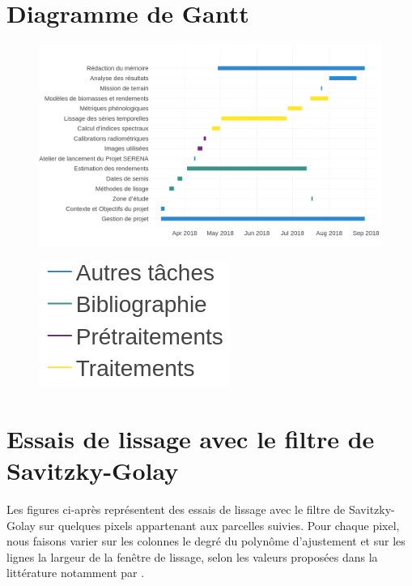 \chapter{Diagramme de Gantt}\label{annexe-a}

\begin{figure}[htbp]
 \begin{center}
  \includegraphics[scale=0.5]{annexes/gantt1.png} 
 \end{center}
\end{figure}

\begin{figure}[htbp]
 \begin{center}
  \includegraphics[scale=0.6]{annexes/gantt2.png} 
 \end{center}
\end{figure}


\chapter{Essais de lissage avec le filtre de Savitzky-Golay}\label{annexe-b}

Les figures ci-après représentent des essais de lissage avec le filtre de Savitzky-Golay sur quelques pixels appartenant aux parcelles suivies. Pour chaque pixel, nous faisons varier sur les colonnes le degré du polynôme d'ajustement et sur les lignes la largeur de la fenêtre de lissage, selon les valeurs proposées dans la littérature notamment par \citet{Chen2004}. 

